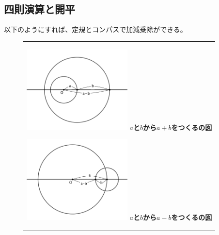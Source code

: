 \subsection{四則演算と開平}
以下のようにすれば、定規とコンパスで加減乗除ができる。
\begin{figure}[H]
  \begin{center}
    \begin{tabular}{c}
        \begin{minipage}{0.5\hsize}
          \begin{center}
            \includegraphics[clip, width=5.5cm]{nakayama2/image/a+b.png}
            \hspace{1.6cm} \bf $a$と$b$から$a+b$をつくるの図
          \end{center}
        \end{minipage}

        \begin{minipage}{0.5\hsize}
          \begin{center}
            \includegraphics[clip, width=5.5cm]{nakayama2/image/a-b.png}
            \hspace{1.6cm} \bf $a$と$b$から$a-b$をつくるの図
          \end{center}
        \end{minipage}
    \end{tabular}
  \end{center}
\end{figure}\par


